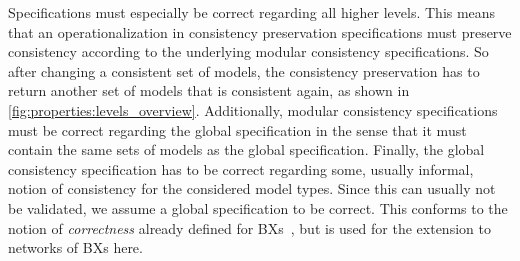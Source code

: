 Specifications must especially be correct regarding all higher levels.
This means that an operationalization in consistency preservation specifications must preserve consistency according to the underlying modular consistency specifications.
So after changing a consistent set of models, the consistency preservation has to return another set of models that is consistent again, as shown in \autoref{fig:properties:levels_overview}.
Additionally, modular consistency specifications must be correct regarding the global specification in the sense that it must contain the same sets of models as the global specification. %
Finally, the global consistency specification has to be correct regarding some, usually informal, notion of consistency for the considered model types.
Since this can usually not be validated, we assume a global specification to be correct. %
This conforms to the notion of \emph{correctness} already defined for \acp{BX}~\cite{stevens2010sosym}, but is used for the extension to networks of \acp{BX} here.




